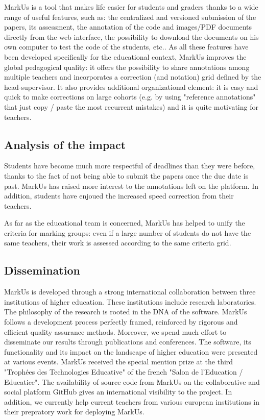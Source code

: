 \documentclass[twocolumn,10pt]{asme2e}
\begin{document}
MarkUs is a tool that makes life easier for students and graders thanks to a wide range of useful features, such as: the centralized and versioned submission of the papers, its assessment, the annotation of the code and images/PDF documents directly from the web interface, the possibility to download the documents on his own computer to test the code of the students, etc.. As all these  features have been developed specifically for the educational context, MarkUs improves the global pedagogical quality: it offers the possibility to share annotations among multiple teachers and incorporates a correction (and notation) grid defined by the head-supervisor. It also provides additional organizational element: it is easy and quick to make corrections on large cohorts (e.g. by using "reference annotations" that just copy / paste the most recurrent mistakes) and it is quite motivating for teachers. 

\subsection*{Analysis of the impact}

Students have become much more respectful of deadlines than they were before, thanks to the fact of not being able to submit the papers once the due date is past. MarkUs has raised more interest to the annotations left on the platform. In addition, students have enjoued the increased speed correction from their teachers. 

As far as the educational team is concerned, MarkUs has helped to unify the criteria for marking groups: even if a large number of students do not have the same teachers, their work is assessed according to the same criteria grid. 

\subsection*{Dissemination}

MarkUs is developed through a strong international collaboration between three institutions of higher education. These institutions include research laboratories. The philosophy of the research is rooted in the DNA of the software. MarkUs follows a development process perfectly framed, reinforced by rigorous and efficient quality assurance methods. Moreover, we spend much effort to disseminate our results through publications and conferences. The software, its functionality and its impact on the landscape of higher education were presented at various events. MarkUs received the special mention prize at the third "Troph\'{e}es des Technologies Educative" of the french "Salon de l'Education / Educatice". 
The availability of source code from MarkUs on the collaborative and social platform GitHub gives an international visibility to the project. In addition, we currently help current teachers from various european institutions in their prepratory work  for deploying MarkUs.
\end{document}
